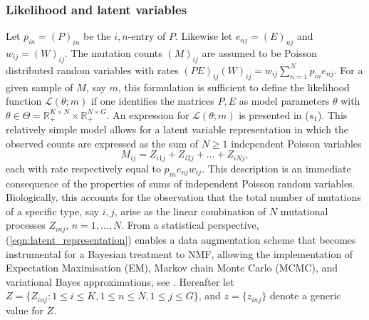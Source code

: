 \documentclass{bioinfo}
\begin{document}
\subsubsection{Likelihood and latent variables}
Let $p_{in} = (P)_{in}$ be the $i,n$-entry of $P$. Likewise let
$e_{nj} = (E)_{nj}$ and $w_{ij} = (W)_{ij}$.  The mutation counts
$(M)_{ij}$ are assumed to be Poisson distributed random variables with
rates $(PE)_{ij}(W)_{ij} = w_{ij}\sum_{n=1}^N p_{in}e_{nj}$. For a
given sample of $M$, say $m$, this formulation is sufficient to define
the likelihood function $\mathcal L(\theta; m)$ if one identifies the
matrices $P, E$ as model parameters $\theta$ with $\theta \in \Theta =
\mathbb R_+^{K\times N}\times \mathbb R_+^{N\times G}$. An expression
for $\mathcal L(\theta; m)$ is presented in ($s_1$). This relatively
simple model allows for a latent variable representation in which the
observed counts are expressed as the sum of $N\geqslant 1$ independent
Poisson variables
\begin{equation}
  \label{eqn:latent_representation}
   M_{ij} = Z_{i1j} + Z_{i2j} + \ldots + Z_{iNj},
\end{equation}
each with rate respectively equal to $p_{in}e_{nj}w_{ij}$. This
description is an immediate consequence of the properties of sums of
independent Poisson random variables. Biologically, this accounts for
the observation that the total number of mutations of a specific type,
say $i,j$, arise as the linear combination of $N$ mutational processes
$Z_{inj}$, $n = 1, \ldots, N$. From a statistical perspective,
(\ref{eqn:latent_representation}) enables a data augmentation scheme
that becomes instrumental for a Bayesian treatment to NMF, allowing
the implementation of Expectation Maximisation (EM), Markov chain
Monte Carlo (MCMC), and variational Bayes approximations, see
\cite{C}.  Hereafter let $Z = \{Z_{inj}: 1\leqslant i\leqslant K,
1\leqslant n \leqslant N, 1\leqslant j\leqslant G\}$, and $z =
\{z_{inj}\}$ denote a generic value for $Z$.
\end{document}
